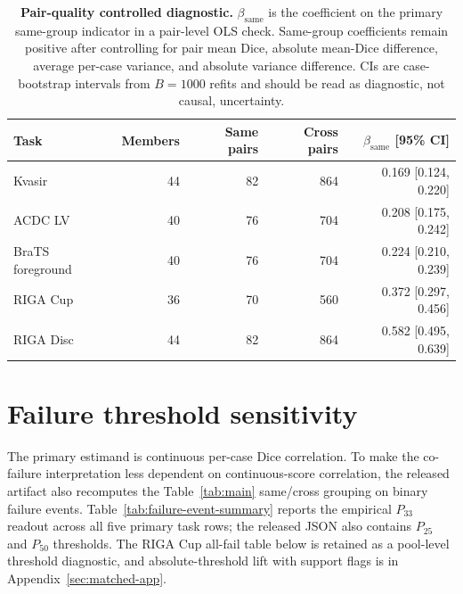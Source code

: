 \begin{table}[!htbp]
  \caption{\textbf{Pair-quality controlled diagnostic.}
  $\beta_{\mathrm{same}}$ is the coefficient on the primary same-group indicator
  in a pair-level OLS check. Same-group coefficients remain positive after controlling for pair mean Dice,
  absolute mean-Dice difference, average per-case variance, and absolute
  variance difference. CIs are case-bootstrap intervals from $B{=}1000$ refits
  and should be read as diagnostic, not causal, uncertainty.}
  \label{tab:quality-controlled-pairs}
  \centering\footnotesize
  \begin{tabular}{lrrrr}
    \toprule
    Task & Members & Same pairs & Cross pairs & $\beta_{\mathrm{same}}$ [95\% CI] \\
    \midrule
    Kvasir & 44 & 82 & 864 & 0.169 [0.124, 0.220] \\
    ACDC LV & 40 & 76 & 704 & 0.208 [0.175, 0.242] \\
    BraTS foreground & 40 & 76 & 704 & 0.224 [0.210, 0.239] \\
    RIGA Cup & 36 & 70 & 560 & 0.372 [0.297, 0.456] \\
    RIGA Disc & 44 & 82 & 864 & 0.582 [0.495, 0.639] \\
    \bottomrule
  \end{tabular}
\end{table}

\section{Failure threshold sensitivity}
\label{app:tau-sweep}
\label{app:failure-event}
The primary estimand is continuous per-case Dice correlation. To make the
co-failure interpretation less dependent on continuous-score correlation, the
released artifact also recomputes the Table~\ref{tab:main} same/cross grouping
on binary failure events. Table~\ref{tab:failure-event-summary} reports the
empirical $P_{33}$ readout across all five primary task rows; the released JSON
also contains $P_{25}$ and $P_{50}$ thresholds. The RIGA Cup all-fail table
below is retained as a pool-level threshold diagnostic, and absolute-threshold
lift with support flags is in Appendix~\ref{sec:matched-app}.

